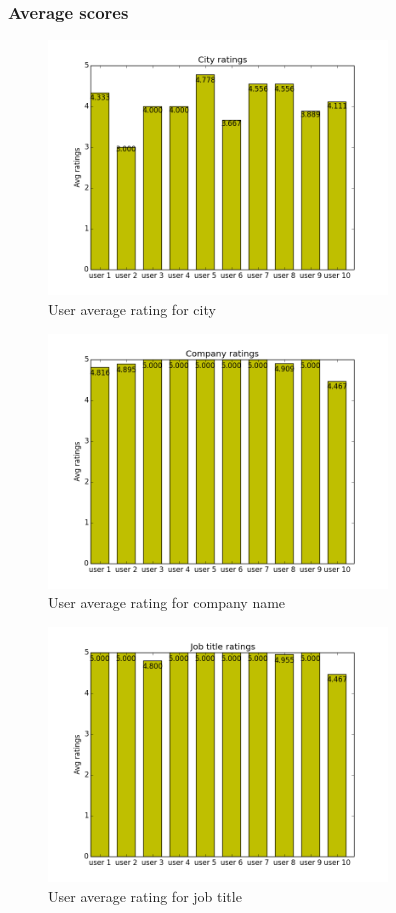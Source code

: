 \subsubsection{Average scores}

\begin{figure}[H]
\centering
\includegraphics[width=90mm]{images/evaluation/average_city_score.png}
\caption{User average rating for city}
\label{fig:city}
\end{figure}

\begin{figure}[H]
\centering
\includegraphics[width=90mm]{images/evaluation/average_company_score.png}
\caption{User average rating for company name}
\label{fig:company}
\end{figure}

\begin{figure}[H]
\centering
\includegraphics[width=90mm]{images/evaluation/average_job_title_score.png}
\caption{User average rating for job title}
\label{fig:job_title}
\end{figure}

